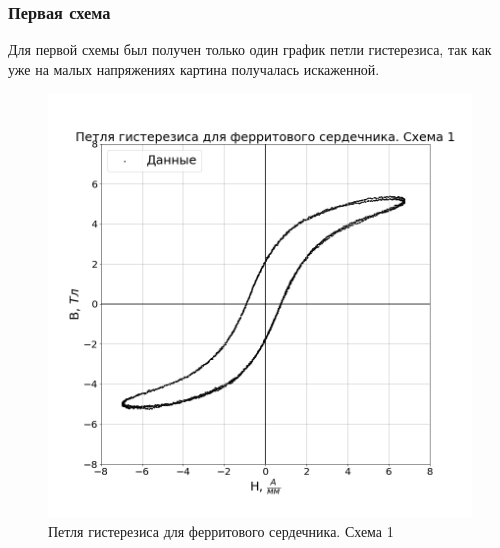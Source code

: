 \documentclass[a4paper,14pt]{extarticle}
\begin{document}
	\subsubsection{Первая схема}
	Для первой схемы был получен только один график петли гистерезиса, так как уже на малых напряжениях картина получалась искаженной. 
	\begin{figure}[h!]
		\includegraphics[width=1.0\linewidth]{Lab2_2.png}
		\caption{Петля гистерезиса для ферритового сердечника. Схема 1}
		\label{fig5}
	\end{figure}
	\newline
\end{document}
